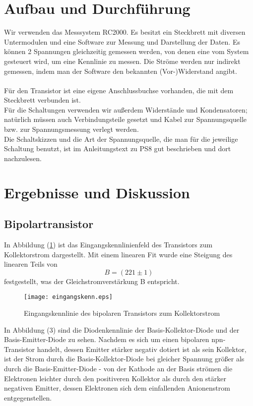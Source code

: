\documentclass[12pt,a4paper,twopage]{article}
\begin{document}
\section{Aufbau und Durchführung}
Wir verwenden das Messsystem RC2000. Es besitzt ein Steckbrett mit diversen Untermodulen und eine Software zur Messung und Darstellung der Daten. Es können 2 Spannungen gleichzeitig gemessen werden, von denen eine vom System gesteuert wird, um eine Kennlinie zu messen. Die Ströme werden nur indirekt gemessen, indem man der Software den bekannten (Vor-)Widerstand angibt.\\
\\
Für den Transistor ist eine eigene Anschlussbuchse vorhanden, die mit dem Steckbrett verbunden ist.\\
Für die Schaltungen verwenden wir außerdem Widerstände und Kondensatoren; natürlich müssen auch Verbindungsteile gesetzt und Kabel zur Spannungsquelle bzw. zur Spannungsmessung verlegt werden.\\
Die Schaltskizzen und die Art der Spannungsquelle, die man für die jeweilige Schaltung benutzt, ist im Anleitungstext zu PS8 gut beschrieben und dort nachzulesen.

\section{Ergebnisse und Diskussion}
\subsection{Bipolartransistor}
In Abbildung (\ref{eingangskenn}) ist das Eingangskennlinienfeld des Transistors zum Kollektorstrom dargestellt. Mit einem linearen Fit wurde eine Steigung des linearen Teils von $$B=(221 \pm 1)$$ festgestellt, was der Gleichstromverstärkung B entspricht.

\begin{figure}[H]
\texttt{[image: eingangskenn.eps]}
\caption{\label{eingangskenn} Eingangskennlinie des bipolaren Transistors zum Kollektorstrom}
\end{figure}

In Abbildung (3) sind die Diodenkennlinie der Basis-Kollektor-Diode und der Basis-Emitter-Diode zu sehen. Nachdem es sich um einen bipolaren npn-Transistor handelt, dessen Emitter stärker negativ dotiert ist als sein Kollektor, ist der Strom durch die Basis-Kollektor-Diode bei gleicher Spannung größer als durch die Basis-Emitter-Diode - von der Kathode an der Basis strömen die Elektronen leichter durch den positiveren Kollektor als durch den stärker negativen Emitter, dessen Elektronen sich dem einfallenden Anionenstrom entgegenstellen.
\end{document}
